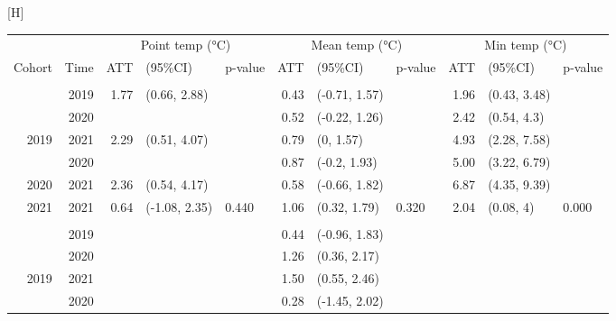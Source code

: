 \documentclass[
  letterpaper,
  DIV=11,
  numbers=noendperiod]{scrartcl}
\makeatletter
\renewenvironment{table}%
  {\renewcommand\familydefault\sfdefault
   \@float{table}}
  {\end@float}
\makeatother
\begin{document}
\hypertarget{tbl-a-het-temp}{}
\begin{table}[H]
\caption{\label{tbl-a-het-temp}Heterogenous treatment effects: Indoor temperature }\tabularnewline

\centering\begingroup\fontsize{9}{11}\selectfont

\begin{tabular}{rrrllrllrll}
\toprule
\multicolumn{2}{c}{ } & \multicolumn{3}{c}{Point temp (°C)} & \multicolumn{3}{c}{Mean temp (°C)} & \multicolumn{3}{c}{Min temp (°C)} \\
\cmidrule(l{3pt}r{3pt}){3-5} \cmidrule(l{3pt}r{3pt}){6-8} \cmidrule(l{3pt}r{3pt}){9-11}
Cohort & Time & ATT & (95\%CI) & p-value & ATT & (95\%CI) & p-value & ATT & (95\%CI) & p-value\\
\midrule
\addlinespace[0.3em]
\multicolumn{11}{l}{\textbf{All times}}\\
 & 2019 & 1.77 & (0.66, 2.88) &  & 0.43 & (-0.71, 1.57) &  & 1.96 & (0.43, 3.48) & \\
\cmidrule{2-11}
 & 2020 &  &  &  & 0.52 & (-0.22, 1.26) &  & 2.42 & (0.54, 4.3) & \\
\cmidrule{2-11}
\multirow[t]{-3}{*}{\raggedleft\arraybackslash \hspace{1em}2019} & 2021 & 2.29 & (0.51, 4.07) &  & 0.79 & (0, 1.57) &  & 4.93 & (2.28, 7.58) & \\
\cmidrule{1-11}
 & 2020 &  &  &  & 0.87 & (-0.2, 1.93) &  & 5.00 & (3.22, 6.79) & \\
\cmidrule{2-11}
\multirow[t]{-2}{*}{\raggedleft\arraybackslash \hspace{1em}2020} & 2021 & 2.36 & (0.54, 4.17) &  & 0.58 & (-0.66, 1.82) &  & 6.87 & (4.35, 9.39) & \\
\cmidrule{1-11}
\hspace{1em}2021 & 2021 & 0.64 & (-1.08, 2.35) & 0.440 & 1.06 & (0.32, 1.79) & 0.320 & 2.04 & (0.08, 4) & 0.000\\
\cmidrule{1-11}
\addlinespace[0.3em]
\multicolumn{11}{l}{\textbf{Daytime}}\\
 & 2019 &  &  &  & 0.44 & (-0.96, 1.83) &  &  &  & \\
\cmidrule{2-11}
 & 2020 &  &  &  & 1.26 & (0.36, 2.17) &  &  &  & \\
\cmidrule{2-11}
\multirow[t]{-3}{*}{\raggedleft\arraybackslash \hspace{1em}2019} & 2021 &  &  &  & 1.50 & (0.55, 2.46) &  &  &  & \\
\cmidrule{1-11}
 & 2020 &  &  &  & 0.28 & (-1.45, 2.02) &  &  &  & \\

\end{tabular}
\end{table}
\end{document}
